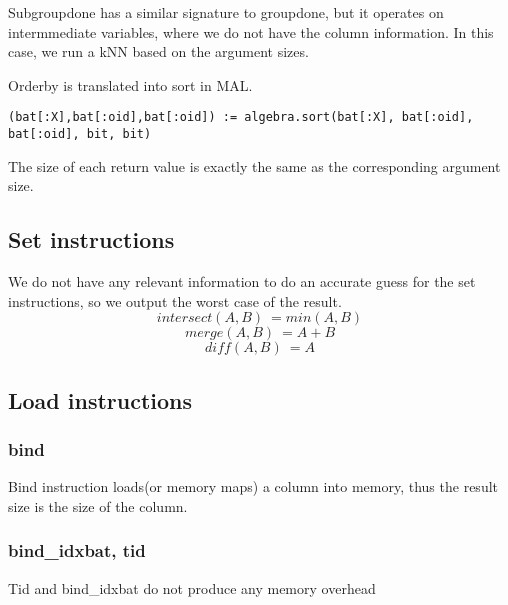 Subgroupdone has a similar signature to groupdone, but it operates on intermmediate
variables, where we do not have the column information. In this case, we run a
kNN based on the argument sizes.

Orderby is translated into sort in MAL.
\begin{verbatim}
(bat[:X],bat[:oid],bat[:oid]) := algebra.sort(bat[:X], bat[:oid], bat[:oid], bit, bit)
\end{verbatim}
The size of each return value is exactly the same as the corresponding argument size.

\subsection{Set instructions}
We do not have any relevant information to do an accurate guess for the
set instructions, so we output the worst case of the result.
$$ intersect(A,B) ~= min(A,B)$$
$$ merge(A,B) ~= A+B $$
$$ diff(A,B) ~= A $$

\subsection{Load instructions}
\subsubsection{bind}
Bind instruction loads(or memory maps) a column into memory,
thus the result size is the size of the column.
\subsubsection{bind\_idxbat, tid}
Tid and bind\_idxbat do not produce any memory overhead

